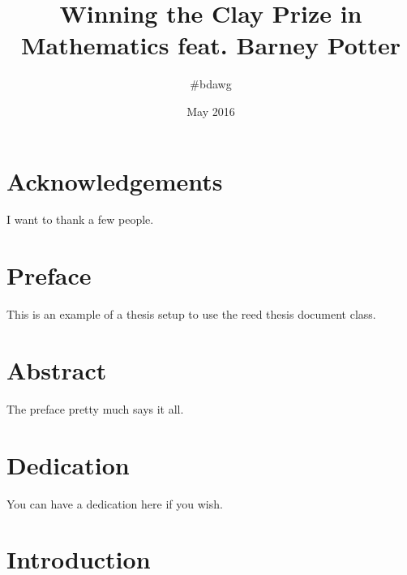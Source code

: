 \documentclass[12pt,twoside]{reedthesis}
\title{Winning the Clay Prize in Mathematics feat. Barney Potter}
\author{\#bdawg}
\date{May 2016}
\begin{document}
  \maketitle
  \frontmatter %
  \pagestyle{empty} %

    \chapter*{Acknowledgements}
	I want to thank a few people.

    \chapter*{Preface}
	This is an example of a thesis setup to use the reed thesis document class.

    \tableofcontents
    \listoftables
    \listoffigures

    \chapter*{Abstract}
	The preface pretty much says it all.
	
	\chapter*{Dedication}
	You can have a dedication here if you wish.

  \mainmatter %
  \pagestyle{fancyplain} %


    \chapter*{Introduction}
\end{document}
